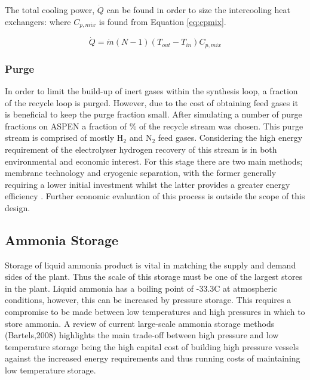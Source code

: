 The total cooling power, $\dot{Q}$ can be found in order to size the intercooling heat exchangers: where $C_{p,mix}$ is found from Equation \ref{eq:cpmix}.


\begin{equation}
\label{eq:coolpowerQ}
\dot{Q} =\dot{m}(N-1)(T_{out}-T_{in})C_{p,mix}
\end{equation}

%
%		
%		
%
%


\subsubsection{Purge}
In order to limit the build-up of inert gases within the synthesis loop, a fraction of the recycle loop is purged. However, due to the cost of obtaining feed gases it is beneficial to keep the purge fraction small. After simulating a number of purge fractions on ASPEN a fraction of \purge \%  of the recycle stream was chosen. This purge stream is comprised of mostly H$_2$ and N$_2$ feed gases. Considering the high energy requirement of the electrolyser hydrogen recovery of this stream is in both environmental and economic interest. For this stage there are two main methods; membrane technology and cryogenic separation, with the former generally requiring a lower initial investment whilst the latter provides a greater energy efficiency \cite{Ojha2010}. Further economic evaluation of this process is outside the scope of this design.

\subsection{Ammonia Storage}
\label{subsec:JRstorage}
Storage of liquid ammonia product is vital in matching the supply and demand sides of the plant. Thus the scale of this storage must be one of the largest stores in the plant. Liquid ammonia has a boiling point of -33.3\textdegree C at atmospheric conditions, however, this can be increased by pressure storage. This requires a compromise to be made between low temperatures and high pressures in which to store ammonia. A review of current large-scale ammonia storage methods (Bartels,2008)\cite{Bartels2008} highlights the main trade-off between high pressure and low temperature storage being the high capital cost of building high pressure vessels against the increased energy requirements and thus running costs of maintaining low temperature storage.

